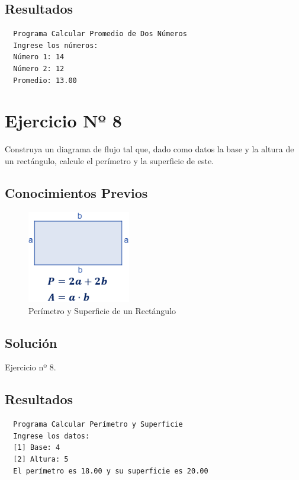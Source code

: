 \subsection{Resultados}
\begin{verbatim}
  Programa Calcular Promedio de Dos Números
  Ingrese los números:
  Número 1: 14
  Número 2: 12
  Promedio: 13.00
\end{verbatim}
\section{Ejercicio Nº 8}
Construya un diagrama de flujo tal que, dado como datos la base y la altura de
un rectángulo, calcule el perímetro y la superficie de este.
\subsection{Conocimientos Previos}
\begin{figure}[H]
	\centering
	\includegraphics[width=4.5cm]{Images/img2.png}
	\caption{Perímetro y Superficie de un Rectángulo}\label{fig:fg2}
\end{figure}
\subsection{Solución}
\begin{longlisting}
	\caption{Ejercicio nº 8.}\label{cod:ex_8}
\end{longlisting}
\subsection{Resultados}
\begin{verbatim}
  Programa Calcular Perímetro y Superficie
  Ingrese los datos:
  [1] Base: 4       
  [2] Altura: 5
  El perímetro es 18.00 y su superficie es 20.00
\end{verbatim}
